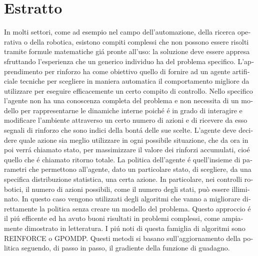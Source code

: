 \newcommand{\estrattoname}{Estratto}
\addcontentsline{toc}{chapter}{\estrattoname}

\begingroup
\let\clearpage\relax
\let\cleardoublepage\relax
\let\cleardoublepage\relax

\chapter*{Estratto}
\begin{otherlanguage}{italian}
In molti settori, come ad esempio nel campo dell'automazione, della ricerca operativa o della robotica, esistono compiti complessi che non possono essere risolti tramite formule matematiche gi\'a pronte all'uso: la soluzione deve essere appresa sfruttando l'esperienza che un generico individuo ha del problema specifico.\newline
 L'apprendimento per rinforzo ha come obiettivo quello di fornire ad un agente artificiale tecniche per scegliere in maniera automatica il comportamento migliore da utilizzare per eseguire efficacemente un certo compito di controllo. Nello specifico l'agente non ha una conoscenza completa del problema e non necessita di un modello per rappresentarne le dinamiche interne poich\'e \'e in grado di interagire e modificare l'ambiente attraverso un certo numero di azioni e di ricevere da esso segnali di rinforzo che sono indici della bont\'a delle sue scelte.
L'agente deve decidere quale azione sia meglio utilizzare in ogni possibile situazione, che da ora in poi verr\'a chiamato stato, per massimizzare il valore dei rinforzi accumulati, cio\'e quello che \'e chiamato ritorno totale.
La politica dell'agente \'e quell'insieme di parametri che permettono all'agente, dato un particolare stato, di scegliere, da una specifica distribuzione statistica, una certa azione.
In particolare, nei controlli robotici, il numero di azioni possibili, come il numero degli stati, può essere illiminato. 
In questo caso vengono utilizzati degli algoritmi che vanno a migliorare direttamente la politica senza creare un modello del problema. 
Questo approccio \'e il pi\'u efficente ed ha avuto buoni risultati in problemi complessi, come ampiamente dimostrato in letteratura. I pi\'u noti di questa famiglia di algoritmi sono REINFORCE o GPOMDP.
Questi metodi si basano sull'aggiornamento della politica seguendo, di passo in passo, il gradiente della funzione di guadagno.

\end{otherlanguage}
